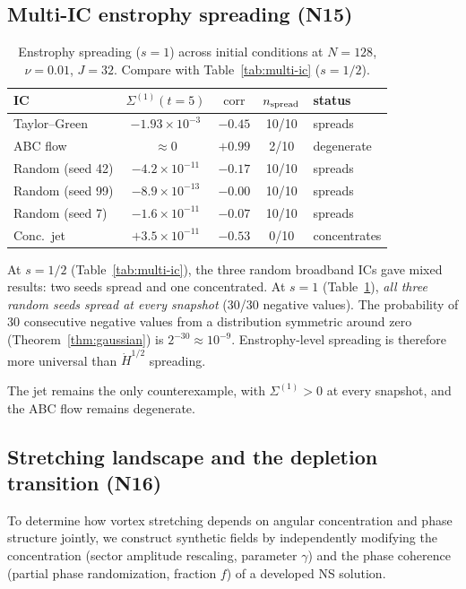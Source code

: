 \documentclass[11pt]{article}
\theoremstyle{definition}
\newcommand{\Hdot}[1]{\dot{H}^{#1}}
\DeclareMathOperator{\corr}{corr}
\begin{document}
\subsection{Multi-IC enstrophy spreading (N15)}
\label{sec:enst-multi-ic}

\begin{table}[h]
\centering
\caption{Enstrophy spreading ($s=1$) across initial
conditions at $N=128$, $\nu=0.01$, $J=32$.
Compare with Table~\ref{tab:multi-ic} ($s=1/2$).}
\label{tab:enst-multi-ic}
\begin{tabular}{@{}lcccl@{}}
\toprule
IC & $\Sigma^{(1)}(t\!=\!5)$ & $\corr$
  & $n_{\rm spread}$ & status \\
\midrule
Taylor--Green
  & $-1.93\times 10^{-3}$ & $-0.45$ & 10/10
  & spreads \\
ABC flow
  & $\approx 0$ & $+0.99$ & 2/10
  & degenerate \\
Random (seed 42)
  & $-4.2\times 10^{-11}$ & $-0.17$ & 10/10
  & spreads \\
Random (seed 99)
  & $-8.9\times 10^{-13}$ & $-0.00$ & 10/10
  & spreads \\
Random (seed 7)
  & $-1.6\times 10^{-11}$ & $-0.07$ & 10/10
  & spreads \\
Conc.\ jet
  & $+3.5\times 10^{-11}$ & $-0.53$ & 0/10
  & concentrates \\
\bottomrule
\end{tabular}
\end{table}

At $s=1/2$ (Table~\ref{tab:multi-ic}), the three
random broadband ICs gave mixed results: two seeds
spread and one concentrated.  At $s=1$
(Table~\ref{tab:enst-multi-ic}), \emph{all three
random seeds spread at every snapshot} (30/30 negative
values).  The probability of 30 consecutive negative
values from a distribution symmetric around zero
(Theorem~\ref{thm:gaussian}) is
$2^{-30}\approx 10^{-9}$.  Enstrophy-level spreading
is therefore more universal than $\Hdot{1/2}$ spreading.

The jet remains the only counterexample, with
$\Sigma^{(1)}>0$ at every snapshot, and the ABC flow
remains degenerate.


\subsection{Stretching landscape and the depletion
transition (N16)}
\label{sec:Phi-landscape}

To determine how vortex stretching depends on
angular concentration and phase structure jointly,
we construct synthetic fields by independently
modifying the concentration (sector amplitude
rescaling, parameter $\gamma$) and the phase
coherence (partial phase randomization, fraction $f$)
of a developed NS solution.
\end{document}
